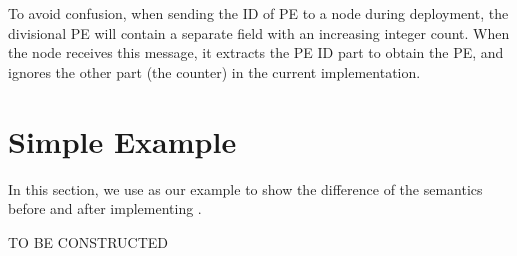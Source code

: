 To avoid confusion, when sending the ID of PE to a node during deployment, the divisional PE will contain a separate field with an increasing integer count. When the node receives this message, it extracts the PE ID part to obtain the PE, and ignores the other part (\ie the counter) in the current implementation.

\section{Simple Example}
In this section, we use \ttsieve as our example to show the difference of the semantics before and after implementing \tdynexp.

TO BE CONSTRUCTED
